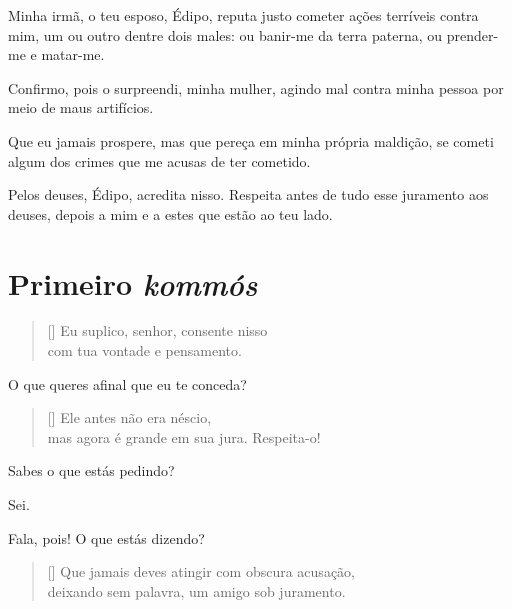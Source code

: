    Minha irmã,  o teu esposo, Édipo, reputa justo cometer ações
terríveis contra mim, um ou outro dentre dois males: ou banir-me da
terra paterna, ou prender-me e matar-me.

   Confirmo, pois o surpreendi, minha mulher, agindo mal contra minha
pessoa por meio de maus artifícios.

   Que eu jamais prospere, mas que pereça em minha própria maldição, se
cometi algum dos crimes que me acusas de ter cometido.

   Pelos deuses, Édipo, acredita nisso. Respeita antes de tudo esse
juramento aos deuses, depois a mim e a estes que estão ao teu lado.

\section{Primeiro \emph{kommós}}




\settowidth{\versewidth}{Eu suplico, senhor, consente nissox}
\begin{verse}[\versewidth]
Eu suplico, senhor, consente nisso\\ 
com tua vontade e pensamento.
\end{verse}

   O que queres afinal que eu te conceda?



\settowidth{\versewidth}{mas agora é grande em sua jura. Respeita-o!x}
\begin{verse}[\versewidth]
Ele antes não era néscio,\\
mas agora é grande em sua jura. Respeita-o!
\end{verse}

   Sabes o que estás pedindo?

   Sei.

   Fala, pois! O que estás dizendo?



\settowidth{\versewidth}{Que jamais deves atingir com obscura acusação,X}
\begin{verse}[\versewidth]
Que jamais deves atingir com obscura acusação,\\
deixando sem palavra, um amigo sob juramento.
\end{verse}

